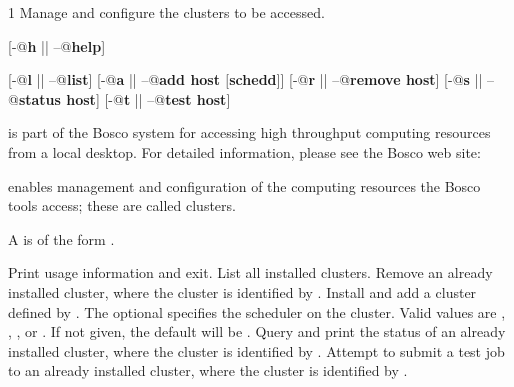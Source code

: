 \begin{ManPage}{\label{man-bosco-cluster}}{1}
{Manage and configure the clusters to be accessed. }


\Synopsis {}
[\verb@-@\textbf{h} || \verb@--@\textbf{help}]

[\verb@-@\textbf{l} || \verb@--@\textbf{list}]
[\verb@-@\textbf{a} || \verb@--@\textbf{add \lt{}host\gt{} $[$schedd$]$}]
[\verb@-@\textbf{r} || \verb@--@\textbf{remove \lt{}host\gt{}}]
[\verb@-@\textbf{s} || \verb@--@\textbf{status \lt{}host\gt{}}]
[\verb@-@\textbf{t} || \verb@--@\textbf{test \lt{}host\gt{}}]

\Description

 is part of the Bosco system for accessing high
throughput computing resources from a local desktop.
For detailed information, please see the Bosco web site:

 enables management and configuration of the computing resources
the Bosco tools access; these are called clusters.

A  is of the form .

\begin{Options}
   {Print usage information and exit.}
   {List all installed clusters.}
   {Remove an already installed cluster,
    where the cluster is identified by .}
    {Install and add a cluster defined by .
    The optional  specifies the scheduler on the cluster.
    Valid values are , , ,  or
    .  If not given, the default will be . }
   {Query and print the status of
    an already installed cluster,
    where the cluster is identified by .}
   {Attempt to submit a test job to 
    an already installed cluster,
    where the cluster is identified by .}

\end{Options}



\end{ManPage}
